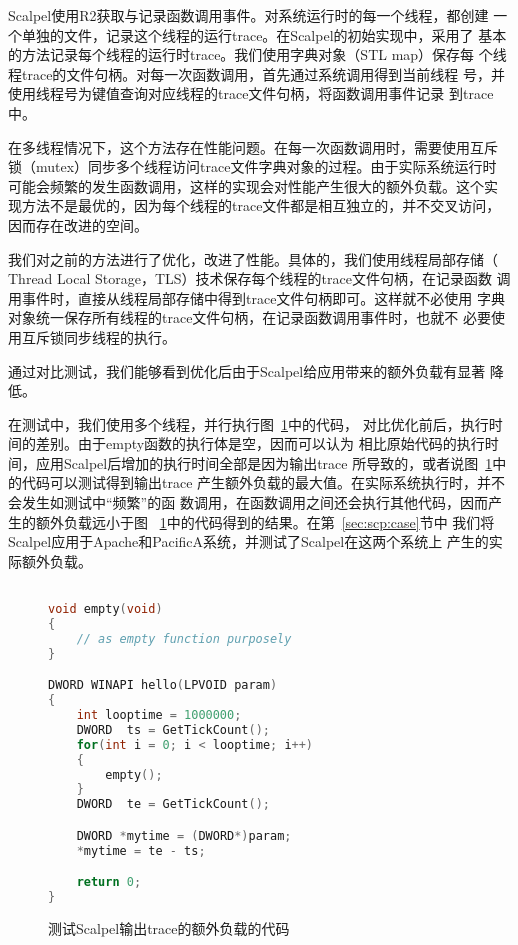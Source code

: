 Scalpel使用R2获取与记录函数调用事件。对系统运行时的每一个线程，都创建
一个单独的文件，记录这个线程的运行trace。在Scalpel的初始实现中，采用了
基本的方法记录每个线程的运行时trace。我们使用字典对象（STL map）保存每
个线程trace的文件句柄。对每一次函数调用，首先通过系统调用得到当前线程
号，并使用线程号为键值查询对应线程的trace文件句柄，将函数调用事件记录
到trace中。

在多线程情况下，这个方法存在性能问题。在每一次函数调用时，需要使用互斥
锁（mutex）同步多个线程访问trace文件字典对象的过程。由于实际系统运行时
可能会频繁的发生函数调用，这样的实现会对性能产生很大的额外负载。这个实
现方法不是最优的，因为每个线程的trace文件都是相互独立的，并不交叉访问，
因而存在改进的空间。

我们对之前的方法进行了优化，改进了性能。具体的，我们使用线程局部存储（
Thread Local Storage，TLS）技术保存每个线程的trace文件句柄，在记录函数
调用事件时，直接从线程局部存储中得到trace文件句柄即可。这样就不必使用
字典对象统一保存所有线程的trace文件句柄，在记录函数调用事件时，也就不
必要使用互斥锁同步线程的执行。

通过对比测试，我们能够看到优化后由于Scalpel给应用带来的额外负载有显著
降低。

在测试中，我们使用多个线程，并行执行图~\ref{fig:scp_perfcode}中的代码，
对比优化前后，执行时间的差别。由于empty函数的执行体是空，因而可以认为
相比原始代码的执行时间，应用Scalpel后增加的执行时间全部是因为输出trace
所导致的，或者说图~\ref{fig:scp_perfcode}中的代码可以测试得到输出trace
产生额外负载的最大值。在实际系统执行时，并不会发生如测试中“频繁”的函
数调用，在函数调用之间还会执行其他代码，因而产生的额外负载远小于图~
\ref{fig:scp_perfcode}中的代码得到的结果。在第~\ref{sec:scp:case}节中
我们将Scalpel应用于Apache和PacificA系统，并测试了Scalpel在这两个系统上
产生的实际额外负载。

\begin{figure}
\centering
\begin{lstlisting}[language=C++,basicstyle=\small]

void empty(void)
{
	// as empty function purposely
}

DWORD WINAPI hello(LPVOID param)
{
	int looptime = 1000000;
	DWORD  ts = GetTickCount();
	for(int i = 0; i < looptime; i++)
	{
		empty();
	}
	DWORD  te = GetTickCount();

	DWORD *mytime = (DWORD*)param;
	*mytime = te - ts;

	return 0;
}
\end{lstlisting}
\caption{测试Scalpel输出trace的额外负载的代码}
\label{fig:scp_perfcode}
\end{figure}

